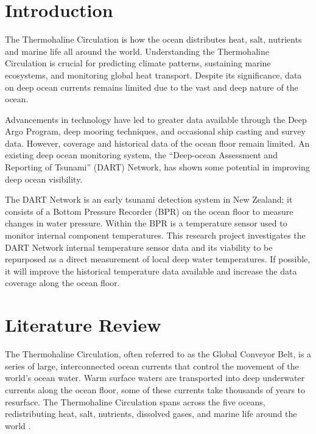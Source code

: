 \documentclass[12pt,a4paper]{article}
\begin{document}
\clearpage

\section{Introduction}

The Thermohaline Circulation is how the ocean distributes heat, salt,
nutrients and marine life all around the world. Understanding the
Thermohaline Circulation is crucial for predicting climate patterns,
sustaining marine ecosystems, and monitoring global heat transport. Despite
its significance, data on deep ocean currents remains limited due to the vast
and deep nature of the ocean.

Advancements in technology have led to greater data available through the
Deep Argo Program, deep mooring techniques, and occasional ship casting and
survey data. However, coverage and historical data of the ocean floor remain
limited. An existing deep ocean monitoring system, the ``Deep-ocean
Assessment and Reporting of Tsunami'' (DART) Network, has shown some
potential in improving deep ocean visibility.

The DART Network is an early tsunami detection system in New Zealand; it
consists of a Bottom Pressure Recorder (BPR) on the ocean floor to measure
changes in water pressure. Within the BPR is a temperature sensor used to
monitor internal component temperatures. This research project investigates
the DART Network internal temperature sensor data and its viability to be
repurposed as a direct measurement of local deep water temperatures. If
possible, it will improve the historical temperature data available and
increase the data coverage along the ocean floor.

\section{Literature Review}

The Thermohaline Circulation, often referred to as the Global Conveyor Belt,
is a series of large, interconnected ocean currents that control the movement
of the world's ocean water. Warm surface waters are transported into deep
underwater currents along the ocean floor, some of these currents take
thousands of years to resurface. The Thermohaline Circulation spans across the
five oceans, redistributing heat, salt, nutrients, dissolved gases, and marine
life around the world \citep{pauthenet2019}.

\newpage %
\end{document}
